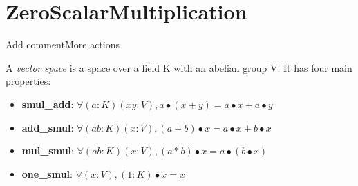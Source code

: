 \section{ZeroScalarMultiplication}Add commentMore actions

\begin{definition}
  \label{definition : VectorSpace}
  \leanok
  A \emph{vector space} is a space over a field K with an abelian group V. It has four main properties:
  \begin{itemize}
    \item \textbf{smul\_add}:
    $\forall (a : K) (x y : V), a \bullet (x + y) = a \bullet x + a \bullet y $
    \item \textbf{add\_smul}:
    $\forall (a b : K) (x : V), (a + b) \bullet x = a \bullet x + b \bullet x $
    \item \textbf{mul\_smul}:
    $\forall (a b : K) (x : V), (a * b) \bullet x = a \bullet (b \bullet x) $
    \item \textbf{one\_smul}:
    $\forall (x : V), (1 : K) \bullet x = x $
  \end{itemize}
\end{definition}